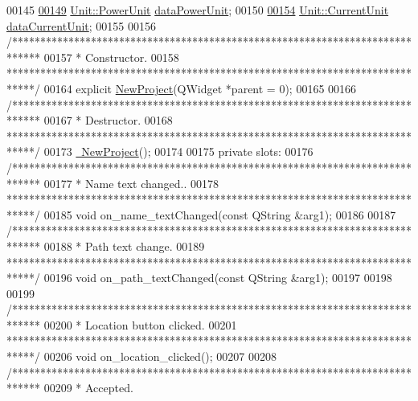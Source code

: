 \begin{DoxyCode}
00145 
\hypertarget{newproject_8h_source_l00149}{}\hyperlink{class_new_project_a500a8b98942c5f4900348fd315fb9d8b}{00149}   \hyperlink{class_unit_ace265ae255370ccacfd5370337572c3b}{Unit::PowerUnit} \hyperlink{class_new_project_a500a8b98942c5f4900348fd315fb9d8b}{dataPowerUnit};
00150 
\hypertarget{newproject_8h_source_l00154}{}\hyperlink{class_new_project_a9d389065ff7f8588338069018088a20f}{00154}   \hyperlink{class_unit_a0794cf6c9682f48296dd4a5315389787}{Unit::CurrentUnit} \hyperlink{class_new_project_a9d389065ff7f8588338069018088a20f}{dataCurrentUnit};
00155 
00156   \textcolor{comment}{/*****************************************************************************}
00157 \textcolor{comment}{  * Constructor.}
00158 \textcolor{comment}{  *****************************************************************************/}
00164   \textcolor{keyword}{explicit} \hyperlink{group___window_ga011ff7a4c380f74bdafa4fdaed510c42}{NewProject}(QWidget *parent = 0);
00165 
00166   \textcolor{comment}{/*****************************************************************************}
00167 \textcolor{comment}{  * Destructor.}
00168 \textcolor{comment}{  *****************************************************************************/}
00173   \hyperlink{group___window_gae65155941598f4272f3df0b2f1428c78}{~NewProject}();
00174 
00175 \textcolor{keyword}{private} slots:
00176   \textcolor{comment}{/*****************************************************************************}
00177 \textcolor{comment}{  * Name text changed..}
00178 \textcolor{comment}{  *****************************************************************************/}
00185   \textcolor{keywordtype}{void} on\_name\_textChanged(\textcolor{keyword}{const} QString &arg1);
00186 
00187   \textcolor{comment}{/*****************************************************************************}
00188 \textcolor{comment}{  * Path text change.}
00189 \textcolor{comment}{  *****************************************************************************/}
00196   \textcolor{keywordtype}{void} on\_path\_textChanged(\textcolor{keyword}{const} QString &arg1);
00197 
00198 
00199   \textcolor{comment}{/*****************************************************************************}
00200 \textcolor{comment}{  * Location button clicked.}
00201 \textcolor{comment}{  *****************************************************************************/}
00206   \textcolor{keywordtype}{void} on\_location\_clicked();
00207 
00208   \textcolor{comment}{/*****************************************************************************}
00209 \textcolor{comment}{  * Accepted.}

\end{DoxyCode}
